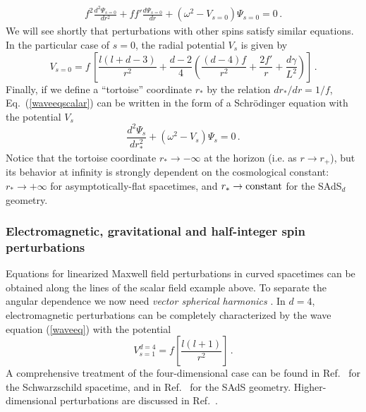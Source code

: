\documentclass[]{iopart}
\def\be{\begin{equation}}
\def\ee{\end{equation}}
\def\beq{\begin{eqnarray}}
\def\eeq{\end{eqnarray}}
\begin{document}
%
\beq
f^2\frac{d^2\Psi_{s=0}}{dr^2}+ff'\frac{d\Psi_{s=0}}{dr}+\left( \omega^2-
V_{s=0}\right)  \Psi_{s=0}=0\,. \label{waveeqscalar} \eeq
%
We will see shortly that perturbations with other spins satisfy similar
equations.  In the particular case of $s=0$, the radial potential $V_s$ is
given by
%
%
\be
V_{s=0}=f\,\left[\frac{l(l+d-3)}{r^2}+\frac{d-2}{4}\left (\frac{(d-4)f}{r^2}+\frac{2f'}{r}+\frac{d\gamma}{L^2}\right)\right]\,.
\ee
%
Finally, if we define a ``tortoise'' coordinate $r_*$ by the relation
$dr_*/dr=1/f$, Eq.~(\ref{waveeqscalar}) can be written in the form of a
Schr\"{o}dinger equation with the potential $V_s$
%
\be \label{waveeq}
\frac{d^2 \Psi_{s}}{dr_*^2} + \left(\omega^2-V_{s}\right)\Psi_{s}=0\,.
\ee
%
Notice that the tortoise coordinate $r_* \rightarrow -\infty$ at the horizon
(i.e. as $r\to r_+$), but its behavior at infinity is strongly dependent on
the cosmological constant: $r_*\rightarrow +\infty$ for asymptotically-flat
spacetimes, and $r_* \rightarrow {\rm constant}$ for the SAdS$_d$ geometry.


\subsubsection*{Electromagnetic, gravitational and half-integer spin perturbations}

Equations for linearized Maxwell field perturbations in curved spacetimes can
be obtained along the lines of the scalar field example above. To separate the
angular dependence we now need {\it vector spherical harmonics}
\cite{Nollert:1999ji,Ruffini,edmonds}.  In $d=4$, electromagnetic
perturbations can be completely characterized by the wave equation
(\ref{waveeq}) with the potential
%
\be V_{s=1}^{d=4}=f\left\lbrack\frac{l(l+1)}{r^2}\right\rbrack \,.
\label{potentialmaxwell} \ee
%
A comprehensive treatment of the four-dimensional case can be found in
Ref.~\cite{Ruffini} for the Schwarzschild spacetime, and in
Ref.~\cite{Cardoso:2001bb} for the SAdS geometry. Higher-dimensional
perturbations are discussed in Ref.~\cite{Crispino:2000jx}.
\end{document}
